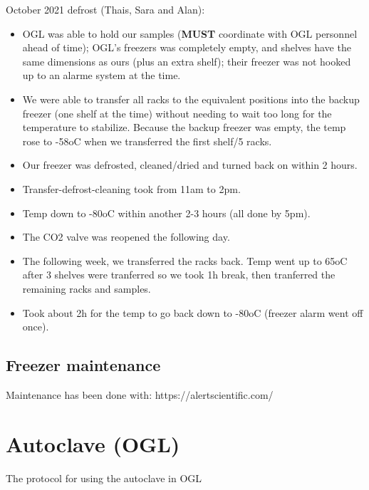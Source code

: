 \documentclass[
  letterpaper,
  DIV=11,
  numbers=noendperiod]{scrreprt}
\begin{document}
October 2021 defrost (Thais, Sara and Alan):

\begin{itemize}
\item
  OGL was able to hold our samples (\textbf{MUST} coordinate with OGL
  personnel ahead of time); OGL's freezers was completely empty, and
  shelves have the same dimensions as ours (plus an extra shelf); their
  freezer was not hooked up to an alarme system at the time.
\item
  We were able to transfer all racks to the equivalent positions into
  the backup freezer (one shelf at the time) without needing to wait too
  long for the temperature to stabilize. Because the backup freezer was
  empty, the temp rose to -58oC when we transferred the first shelf/5
  racks.
\item
  Our freezer was defrosted, cleaned/dried and turned back on within 2
  hours.
\item
  Transfer-defrost-cleaning took from 11am to 2pm.
\item
  Temp down to -80oC within another 2-3 hours (all done by 5pm).
\item
  The CO2 valve was reopened the following day.
\item
  The following week, we transferred the racks back. Temp went up to
  65oC after 3 shelves were tranferred so we took 1h break, then
  tranferred the remaining racks and samples.
\item
  Took about 2h for the temp to go back down to -80oC (freezer alarm
  went off once).
\end{itemize}

\hypertarget{freezer-maintenance}{%
\section*{\texorpdfstring{\textbf{Freezer
maintenance}}{Freezer maintenance}}\label{freezer-maintenance}}


Maintenance has been done with: https://alertscientific.com/

\hypertarget{autoclave-ogl}{%
\chapter{Autoclave (OGL)}\label{autoclave-ogl}}

The protocol for using the autoclave in OGL
\end{document}
